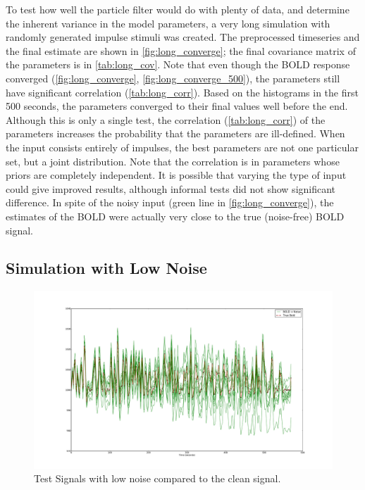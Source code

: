 To test how well the particle filter would do with plenty of data, and
determine the inherent variance in the model parameters, a very long simulation
with randomly generated impulse stimuli was created. The preprocessed timeseries
and the final estimate are shown in \autoref{fig:long_converge};
the final covariance matrix of the parameters is in \autoref{tab:long_cov}.
Note that even though the BOLD response converged (\autoref{fig:long_converge},
\autoref{fig:long_converge_500}),
the parameters still have significant correlation (\autoref{tab:long_corr}).
Based on the histograms in the first 500 seconds, the parameters converged to
their final values well before the end.
Although this is only a single test, the correlation (\autoref{tab:long_corr})
of the parameters increases the probability that the parameters are
ill-defined. When the input
consists entirely of impulses, the best parameters are not one particular
set, but a joint distribution. Note that the correlation is in parameters whose priors
are completely independent. It is possible that varying the type of input could
give improved results, although informal tests did not show significant difference.
In spite of the noisy input (green line in \autoref{fig:long_converge}), the estimates
of the BOLD were actually very close to the true (noise-free) BOLD signal.

\subsection{Simulation with Low Noise}
\label{sec:SimLowNoise}
\begin{figure}
\centering
\includegraphics[clip=true,trim=6cm 2cm 5cm 3.5cm,width=15cm]{images/realization_lownoise}
\caption{Test Signals with low noise compared to the clean signal.}
\label{fig:LowNoiseRealization}
\end{figure}

